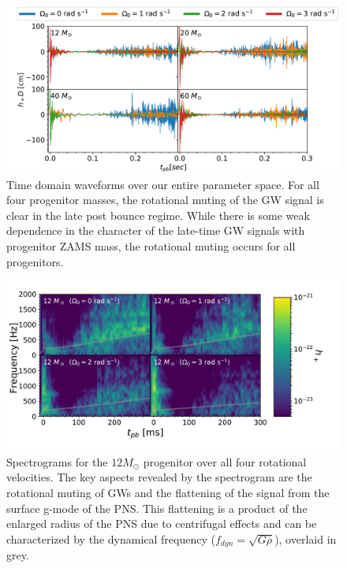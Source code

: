 \documentclass[twocolumn,times]{aastex62}  %
\begin{document}
\begin{figure}[t]
\includegraphics[width=\textwidth]{figures/ccsn2D_M1_all.pdf}
\centering
\caption{Time domain waveforms over our entire parameter space.  For all four progenitor masses, the rotational muting of the GW signal is clear in the late post bounce regime.  While there is some weak dependence in the character of the late-time GW signals with progenitor ZAMS mass, the rotational muting occurs for all progenitors.}
\label{fig:ccsn_all}
\end{figure}

\begin{figure}[t]
    \centering
    \includegraphics[scale=0.38]{figures/gws_2x2_line_M1.pdf}
    \caption{Spectrograms for the $12 M_\odot$ progenitor over all four rotational velocities.  The key aspects revealed by the spectrogram are the rotational muting of GWs and the flattening of the signal from the surface g-mode of the PNS.  This flattening is a product of the enlarged radius of the PNS due to centrifugal effects and can be characterized by the dynamical frequency ($f_{dyn} = \sqrt{G \overline{\rho}}$), overlaid in grey.}
    \label{fig:2x2}
\end{figure}
\end{document}
